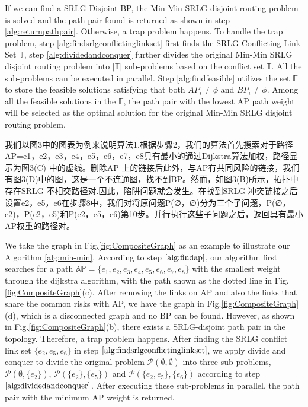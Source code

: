 If we can find a SRLG-Disjoint BP, the Min-Min SRLG disjoint routing problem is solved and  the path pair found is returned as shown in step \ref{alg:returnpathpair}. Otherwise, a trap problem happens. To handle the trap problem, step  \ref{alg:findsrlgconflictinglinkset} first finds the SRLG Conflicting Link Set $\mathbb{T}$, step \ref{alg:dividedandconquer} further divides the original  Min-Min SRLG disjoint routing problem into $\left| \mathbb{T} \right|$ sub-problems based on the conflict set $\mathbb{T}$. All the sub-problems can be executed in parallel. Step \ref{alg:findfeasible} utilizes the set $\mathbb{F}$ to store the feasible solutions  satisfying that  both $A{P_i} \ne \phi$ and $B{P_i} \ne \phi$. Among all the feasible solutions in the $\mathbb{F}$, the path pair with the lowest AP path weight will be selected as the optimal solution for the original Min-Min SRLG disjoint routing problem.


我们以图3中的图表为例来说明算法1.根据步骤2，我们的算法首先搜索对于路径AP={e1，e2，e3，e4，e5，e6，e7，e8}具有最小的通过Dijkstra算法加权，路径显示为图3(C) 中的虚线。删除AP 上的链接后此外，与AP有共同风险的链接，我们有图3(D)中的图，这是一个不连通图，找不到BP。然而，如图3(B)所示，拓扑中存在SRLG-不相交路径对.因此，陷阱问题就会发生。在找到SRLG 冲突链接之后设置{e2，e5，e6}在步骤8中，我们对将原问题P(∅，∅)分为三个子问题，P(∅，{e2})，P({e2}，{e5})和P({e2，e5}，{e6})第10步。并行执行这些子问题之后，返回具有最小AP权重的路径对。


We take the graph in Fig.\ref{fig:CompositeGraph} as an example to illustrate  our Algorithm \ref{alg:min-min}.
According to step $\ref{alg:findap}$, our  algorithm first searches for a path  $\mathbb{AP}=\{e_1,e_2,e_3,e_4,e_5,e_6,e_7,e_8\}$ with the smallest weight through the dijkstra algorithm, with the path shown as the dotted line in Fig.\ref{fig:CompositeGraph}(c). After removing the links on AP and also the links that share the common risks with AP, we have the graph in Fig.\ref{fig:CompositeGraph}(d), which is a disconnected graph and no BP can be found. %
However, as shown in Fig.\ref{fig:CompositeGraph}(b), there exists a SRLG-disjoint path pair in the topology. Therefore, a trap problem happens. After finding the SRLG conflict link set $\{e_2,e_5,e_6\}$ in step $\ref{alg:findsrlgconflictinglinkset}$, we apply divide and conquer to divide the original problem ${\mathcal P}(\emptyset ,\emptyset )$  into three sub-problems, ${\mathcal P}(\emptyset ,\{e_2\} )$, ${\mathcal P}(\{e_2\} ,\{e_5\} )$ and ${\mathcal P}(\{e_2,e_5\} ,\{e_6\} )$ according to step $\ref{alg:dividedandconquer}$. After executing these sub-problems in parallel, the path pair with the minimum AP weight is returned.

